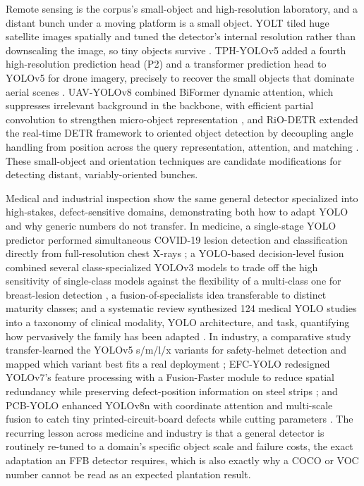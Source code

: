 Remote sensing is the corpus's small-object and high-resolution laboratory, and a distant bunch under a moving platform is a small object. YOLT tiled huge satellite images spatially and tuned the detector's internal resolution rather than downscaling the image, so tiny objects survive \cite{vanetten2018yolt}. TPH-YOLOv5 added a fourth high-resolution prediction head (P2) and a transformer prediction head to YOLOv5 for drone imagery, precisely to recover the small objects that dominate aerial scenes \cite{zhu2021tphyolov5}. UAV-YOLOv8 combined BiFormer dynamic attention, which suppresses irrelevant background in the backbone, with efficient partial convolution to strengthen micro-object representation \cite{wang2023uavyolo}, and RiO-DETR extended the real-time DETR framework to oriented object detection by decoupling angle handling from position across the query representation, attention, and matching \cite{hu2026riodetr}. These small-object and orientation techniques are candidate modifications for detecting distant, variably-oriented bunches.

Medical and industrial inspection show the same general detector specialized into high-stakes, defect-sensitive domains, demonstrating both how to adapt YOLO and why generic numbers do not transfer. In medicine, a single-stage YOLO predictor performed simultaneous COVID-19 lesion detection and classification directly from full-resolution chest X-rays \cite{alantari2020covid}; a YOLO-based decision-level fusion combined several class-specialized YOLOv3 models to trade off the high sensitivity of single-class models against the flexibility of a multi-class one for breast-lesion detection \cite{baccouche2021breast}, a fusion-of-specialists idea transferable to distinct maturity classes; and a systematic review synthesized 124 medical YOLO studies into a taxonomy of clinical modality, YOLO architecture, and task, quantifying how pervasively the family has been adapted \cite{qureshi2024medyolo}. In industry, a comparative study transfer-learned the YOLOv5 s/m/l/x variants for safety-helmet detection and mapped which variant best fits a real deployment \cite{zhou2021helmet}; EFC-YOLO redesigned YOLOv7's feature processing with a Fusion-Faster module to reduce spatial redundancy while preserving defect-position information on steel strips \cite{yang2023efcyolo}; and PCB-YOLO enhanced YOLOv8n with coordinate attention and multi-scale fusion to catch tiny printed-circuit-board defects while cutting parameters \cite{tang2024pcbyolo}. The recurring lesson across medicine and industry is that a general detector is routinely re-tuned to a domain's specific object scale and failure costs, the exact adaptation an FFB detector requires, which is also exactly why a COCO or VOC number cannot be read as an expected plantation result.

